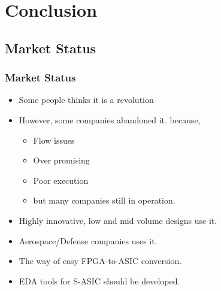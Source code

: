 \documentclass{beamer}
\begin{document}
\section{Conclusion}
\subsection{Market Status}
\frame
{
  \frametitle{Market Status}
  \begin{itemize}
  \item Some people thinks it is a revolution
  \item However, some companies abandoned it. because,
  \begin{itemize}
  \item	Flow issues
  \item Over promising
  \item Poor execution
  \item but many companies still in operation.
  \end{itemize}
  \item Highly innovative, low and mid volume designs use it.
  \item Aerospace/Defense companies uses it.
  \item The way of easy FPGA-to-ASIC conversion.
  \item EDA tools for S-ASIC should be developed.
  \end{itemize}
}
\end{document}
